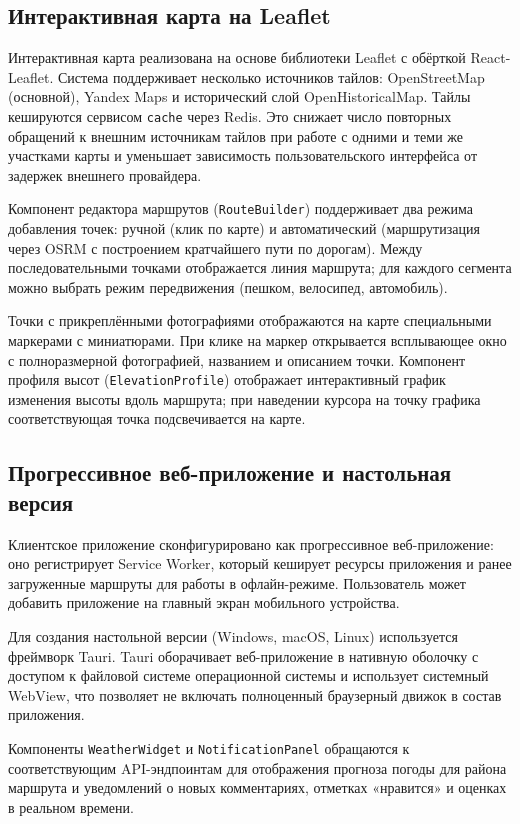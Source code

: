 \subsection{Интерактивная карта на Leaflet}

Интерактивная карта реализована на основе библиотеки Leaflet с обёрткой
React-Leaflet. Система поддерживает несколько источников тайлов: OpenStreetMap
(основной), Yandex Maps и исторический слой OpenHistoricalMap. Тайлы кешируются
сервисом \texttt{cache} через Redis. Это снижает число повторных обращений к
внешним источникам тайлов при работе с одними и теми же участками карты и
уменьшает зависимость пользовательского интерфейса от задержек внешнего
провайдера.

Компонент редактора маршрутов (\texttt{RouteBuilder}) поддерживает два режима добавления точек: ручной (клик по карте) и автоматический (маршрутизация через OSRM с построением кратчайшего пути по дорогам). Между последовательными точками отображается линия маршрута; для каждого сегмента можно выбрать режим передвижения (пешком, велосипед, автомобиль).

Точки с прикреплёнными фотографиями отображаются на карте специальными маркерами с миниатюрами. При клике на маркер открывается всплывающее окно с полноразмерной фотографией, названием и описанием точки. Компонент профиля высот (\texttt{ElevationProfile}) отображает интерактивный график изменения высоты вдоль маршрута; при наведении курсора на точку графика соответствующая точка подсвечивается на карте.

\subsection{Прогрессивное веб-приложение и настольная версия}

Клиентское приложение сконфигурировано как прогрессивное веб-приложение: оно регистрирует Service Worker, который кеширует ресурсы приложения и ранее загруженные маршруты для работы в офлайн-режиме. Пользователь может добавить приложение на главный экран мобильного устройства.

Для создания настольной версии (Windows, macOS, Linux) используется фреймворк
Tauri. Tauri оборачивает веб-приложение в нативную оболочку с доступом к
файловой системе операционной системы и использует системный WebView, что
позволяет не включать полноценный браузерный движок в состав приложения.

Компоненты \texttt{WeatherWidget} и \texttt{NotificationPanel} обращаются к соответствующим API-эндпоинтам для отображения прогноза погоды для района маршрута и уведомлений о новых комментариях, отметках «нравится» и оценках в реальном времени.


